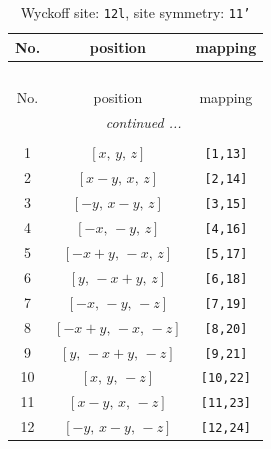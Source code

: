 \documentclass[fleqn,8pt]{jsarticle}
\begin{document}
\begin{longtable}{ccc}
\caption{Wyckoff site: {\tt 12l}, site symmetry: {\tt 11'}}
 \\
 \hline \hline
No. & position & mapping \\ \hline \endfirsthead

\multicolumn{2}{l}{\tablename\ \thetable{}} \\
 \hline \hline
No. & position & mapping \\ \hline \endhead

 \hline \hline
\multicolumn{2}{r}{\footnotesize\it continued ...} \\ \endfoot

 \hline \hline
\multicolumn{2}{r}{} \\ \endlastfoot

1 & $\left[ x,\, y,\, z \right]$ & {\tt [1,13]} \\ \hline
2 & $\left[ x - y,\, x,\, z \right]$ & {\tt [2,14]} \\ \hline
3 & $\left[ - y,\, x - y,\, z \right]$ & {\tt [3,15]} \\ \hline
4 & $\left[ - x,\, - y,\, z \right]$ & {\tt [4,16]} \\ \hline
5 & $\left[ - x + y,\, - x,\, z \right]$ & {\tt [5,17]} \\ \hline
6 & $\left[ y,\, - x + y,\, z \right]$ & {\tt [6,18]} \\ \hline
7 & $\left[ - x,\, - y,\, - z \right]$ & {\tt [7,19]} \\ \hline
8 & $\left[ - x + y,\, - x,\, - z \right]$ & {\tt [8,20]} \\ \hline
9 & $\left[ y,\, - x + y,\, - z \right]$ & {\tt [9,21]} \\ \hline
10 & $\left[ x,\, y,\, - z \right]$ & {\tt [10,22]} \\ \hline
11 & $\left[ x - y,\, x,\, - z \right]$ & {\tt [11,23]} \\ \hline
12 & $\left[ - y,\, x - y,\, - z \right]$ & {\tt [12,24]} \\
\end{longtable}
\end{document}
